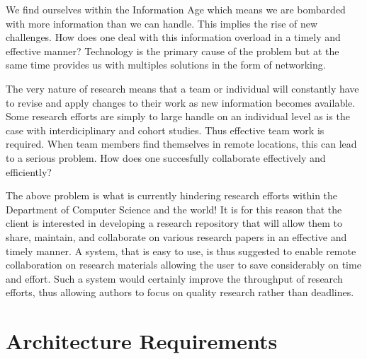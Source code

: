 \documentclass[a4paper,12pt]{article}
\begin{document}
We find ourselves within the Information Age which means we are bombarded with more information than we can handle. This implies the rise of new challenges. How does one deal with this information overload in a timely and effective manner? Technology is the primary cause of the problem but at the same time provides us with multiples solutions in the form of networking. 

The very nature of research means that a team or individual will constantly have to revise and apply changes to their work as new information becomes available. Some research efforts are simply to large handle on an individual level as is the case with interdiciplinary and cohort studies. Thus effective team work is required. When team members find themselves in remote locations, this can lead to a serious problem. How does one succesfully collaborate effectively and efficiently?

The above problem is what is currently hindering research efforts within the Department of Computer Science and the world! It is for this reason that the client is interested in developing a research repository that will allow them to share, maintain, and collaborate on various research papers in an effective and timely manner. A system, that is easy to use, is thus suggested to enable remote collaboration on research materials allowing the user to save considerably on time and effort. Such a system would certainly improve the throughput of research efforts, thus allowing authors to focus on quality research rather than deadlines.  

\newpage
\section{Architecture Requirements}
\end{document}
